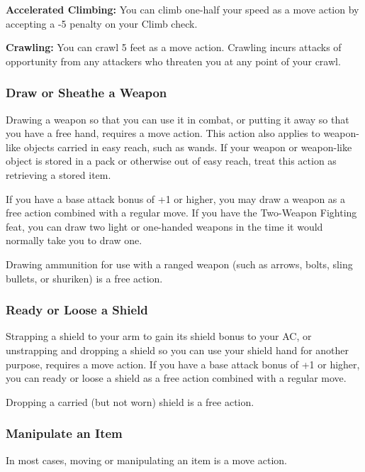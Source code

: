 \documentclass{article}
\begin{document}
\textbf{Accelerated Climbing:} You can climb one-half your speed as a move action 
by accepting a -5 penalty on your Climb check.

\textbf{Crawling:} You can crawl 5 feet as a move action. Crawling incurs attacks 
of opportunity from any attackers who threaten you at any point of your crawl.

\vspace{12pt}
\subsubsection*{\textbf{Draw or Sheathe a Weapon}}

Drawing a weapon so that you can use it in combat, or putting it away so that you 
have a free hand, requires a move action. This action also applies to weapon-like 
objects carried in easy reach, such as wands. If your weapon or weapon-like object 
is stored in a pack or otherwise out of easy reach, treat this action as retrieving 
a stored item.

If you have a base attack bonus of +1 or higher, you may draw a weapon as a free 
action combined with a regular move. If you have the Two-Weapon Fighting feat, 
you can draw two light or one-handed weapons in the time it would normally take 
you to draw one.

Drawing ammunition for use with a ranged weapon (such as arrows, bolts, sling bullets, 
or shuriken) is a free action.

\vspace{12pt}
\subsubsection*{\textbf{Ready or Loose a Shield}}

Strapping a shield to your arm to gain its shield bonus to your AC, or unstrapping 
and dropping a shield so you can use your shield hand for another purpose, requires 
a move action. If you have a base attack bonus of +1 or higher, you can ready or 
loose a shield as a free action combined with a regular move.

Dropping a carried (but not worn) shield is a free action.

\vspace{12pt}
\subsubsection*{\textbf{Manipulate an Item}}

In most cases, moving or manipulating an item is a move action.
\end{document}
